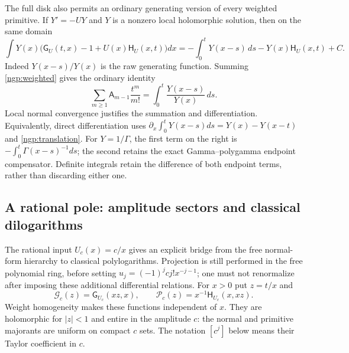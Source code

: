 The full disk also permits an ordinary generating version of every
weighted primitive. If $Y'=-UY$ and $Y$ is a nonzero local holomorphic
solution, then on the same domain
\begin{equation}\label{pgc:weighted-generator}
 \int Y(x)\bigl(\mathsf G_U(t,x)-1+U(x)\mathsf H_U(x,t)\bigr)dx
 =-\int_0^tY(x-s)\,ds-Y(x)\mathsf H_U(x,t)+C.
\end{equation}
Indeed $Y(x-s)/Y(x)$ is the raw generating function. Summing
\eqref{ngp:weighted} gives the ordinary identity
\[
 \sum_{m\ge1}\mathsf A_{m-1}\frac{t^m}{m!}
       =\int_0^t\frac{Y(x-s)}{Y(x)}\,ds.
\]
Local normal convergence justifies the summation and differentiation.
Equivalently, direct differentiation uses
$\partial_x\int_0^tY(x-s)ds=Y(x)-Y(x-t)$ and
\eqref{ngp:translation}. For $Y=1/\Gamma$, the first term on the
right is $-\int_0^t\Gamma(x-s)^{-1}ds$; the second retains the exact
Gamma--polygamma endpoint compensator. Definite integrals retain the
difference of both endpoint terms, rather than discarding either one.

\subsection{A rational pole: amplitude sectors and classical dilogarithms}

The rational input $U_c(x)=c/x$ gives an explicit bridge from the free
normal-form hierarchy to classical polylogarithms. Projection is still
performed in the free polynomial ring, before setting
$u_j=(-1)^jcj!x^{-j-1}$; one must not renormalize after imposing these
additional differential relations. For $x>0$ put $z=t/x$ and
\[
 \mathcal G_c(z)=\mathsf G_{U_c}(xz,x),\qquad
 \mathcal P_c(z)=x^{-1}\mathsf H_{U_c}(x,xz).
\]
Weight homogeneity makes these functions independent of $x$.
They are holomorphic for $|z|<1$ and entire in the amplitude $c$:
the normal and primitive majorants are uniform on compact $c$ sets.
The notation $[c^j]$ below means their Taylor coefficient in $c$.

